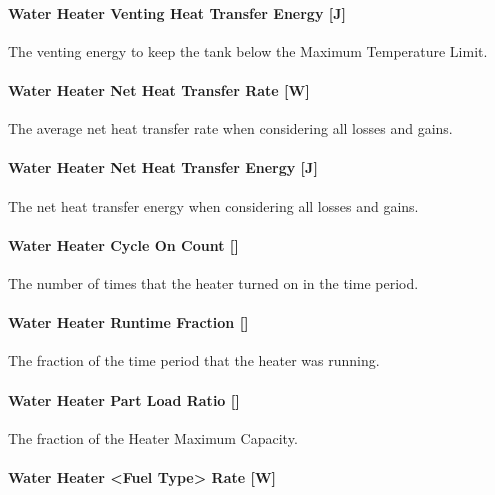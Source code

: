 \paragraph{Water Heater Venting Heat Transfer Energy {[}J{]}}\label{water-heater-venting-heat-transfer-energy-j}

The venting energy to keep the tank below the Maximum Temperature Limit.

\paragraph{Water Heater Net Heat Transfer Rate {[}W{]}}\label{water-heater-net-heat-transfer-rate-w}

The average net heat transfer rate when considering all losses and gains.

\paragraph{Water Heater Net Heat Transfer Energy {[}J{]}}\label{water-heater-net-heat-transfer-energy-j}

The net heat transfer energy when considering all losses and gains.

\paragraph{Water Heater Cycle On Count {[]}}\label{water-heater-cycle-on-count}

The number of times that the heater turned on in the time period.

\paragraph{Water Heater Runtime Fraction {[]}}\label{water-heater-runtime-fraction}

The fraction of the time period that the heater was running.

\paragraph{Water Heater Part Load Ratio {[]}}\label{water-heater-part-load-ratio}

The fraction of the Heater Maximum Capacity.

\paragraph{Water Heater \textless{}Fuel Type\textgreater{} Rate {[}W{]}}\label{water-heater-fuel-type-rate-w}

